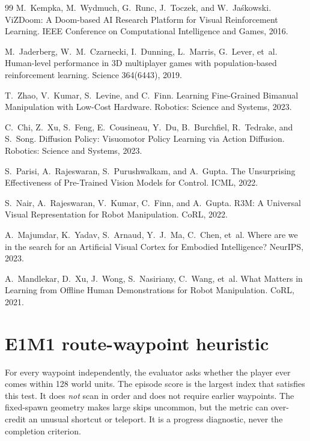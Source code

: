\documentclass[11pt]{article}
\begin{document}
\begin{thebibliography}{99}
M.~Kempka, M.~Wydmuch, G.~Runc, J.~Toczek, and W.~Ja\'skowski.
\newblock ViZDoom: A Doom-based AI Research Platform for Visual Reinforcement Learning.
\newblock IEEE Conference on Computational Intelligence and Games, 2016.

M.~Jaderberg, W.~M.~Czarnecki, I.~Dunning, L.~Marris, G.~Lever, et~al.
\newblock Human-level performance in 3D multiplayer games with population-based reinforcement learning.
\newblock Science 364(6443), 2019.

T.~Zhao, V.~Kumar, S.~Levine, and C.~Finn.
\newblock Learning Fine-Grained Bimanual Manipulation with Low-Cost Hardware.
\newblock Robotics: Science and Systems, 2023.

C.~Chi, Z.~Xu, S.~Feng, E.~Cousineau, Y.~Du, B.~Burchfiel, R.~Tedrake, and S.~Song.
\newblock Diffusion Policy: Visuomotor Policy Learning via Action Diffusion.
\newblock Robotics: Science and Systems, 2023.

S.~Parisi, A.~Rajeswaran, S.~Purushwalkam, and A.~Gupta.
\newblock The Unsurprising Effectiveness of Pre-Trained Vision Models for Control.
\newblock ICML, 2022.

S.~Nair, A.~Rajeswaran, V.~Kumar, C.~Finn, and A.~Gupta.
\newblock R3M: A Universal Visual Representation for Robot Manipulation.
\newblock CoRL, 2022.

A.~Majumdar, K.~Yadav, S.~Arnaud, Y.~J.~Ma, C.~Chen, et~al.
\newblock Where are we in the search for an Artificial Visual Cortex for Embodied Intelligence?
\newblock NeurIPS, 2023.

A.~Mandlekar, D.~Xu, J.~Wong, S.~Nasiriany, C.~Wang, et~al.
\newblock What Matters in Learning from Offline Human Demonstrations for Robot Manipulation.
\newblock CoRL, 2021.

\end{thebibliography}

\appendix
\small

\section{E1M1 route-waypoint heuristic}\label{app:ladder}

For every waypoint independently, the evaluator asks whether the player ever comes within 128 world units. The episode score is the largest index that satisfies this test. It does \emph{not} scan in order and does not require earlier waypoints. The fixed-spawn geometry makes large skips uncommon, but the metric can over-credit an unusual shortcut or teleport. It is a progress diagnostic, never the completion criterion.
\end{document}
